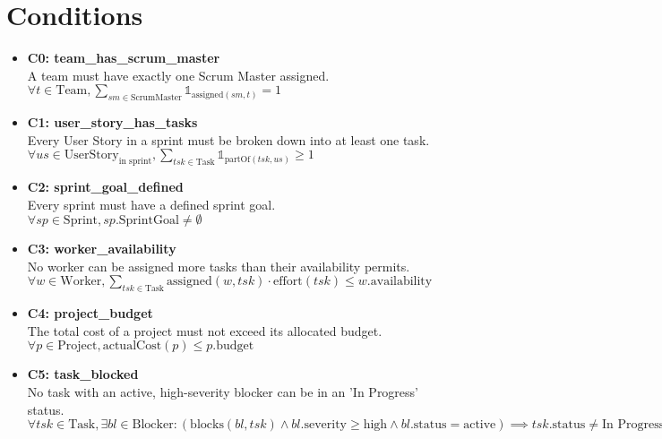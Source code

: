 \documentclass[11pt]{article}
\begin{document}
\section{Conditions}
\begin{itemize}
    \item \textbf{C0: team\_has\_scrum\_master} \\
    A team must have exactly one Scrum Master assigned. \\
    $\forall t \in \text{Team}, \sum_{sm \in \text{ScrumMaster}} \mathbb{1}_{\text{assigned}(sm, t)} = 1$

    \item \textbf{C1: user\_story\_has\_tasks} \\
    Every User Story in a sprint must be broken down into at least one task. \\
    $\forall us \in \text{UserStory}_{\text{in sprint}}, \sum_{tsk \in \text{Task}} \mathbb{1}_{\text{partOf}(tsk, us)} \geq 1$

    \item \textbf{C2: sprint\_goal\_defined} \\
    Every sprint must have a defined sprint goal. \\
    $\forall sp \in \text{Sprint}, sp.\text{SprintGoal} \neq \emptyset$

    \item \textbf{C3: worker\_availability} \\
    No worker can be assigned more tasks than their availability permits. \\
    $\forall w \in \text{Worker}, \sum_{tsk \in \text{Task}} \text{assigned}(w, tsk) \cdot \text{effort}(tsk) \leq w.\text{availability}$

    \item \textbf{C4: project\_budget} \\
    The total cost of a project must not exceed its allocated budget. \\
    $\forall p \in \text{Project}, \text{actualCost}(p) \leq p.\text{budget}$

    \item \textbf{C5: task\_blocked} \\
    No task with an active, high-severity blocker can be in an 'In Progress' status. \\
    $\forall tsk \in \text{Task}, \exists bl \in \text{Blocker}: (\text{blocks}(bl, tsk) \land bl.\text{severity} \geq \text{high} \land bl.\text{status}=\text{active}) \implies tsk.\text{status} \neq \text{In Progress}$


\end{itemize}
\end{document}
